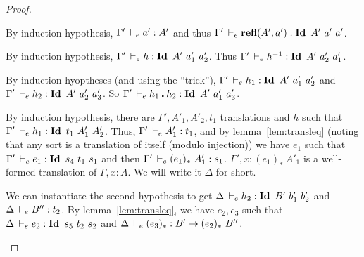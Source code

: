 \documentclass[a4paper,english]{lipics-utf8x}
\begin{document}
\begin{proof}
\begin{caselist}
      \begin{graycase}
        \begin{mathc}
        \end{mathc}
        By induction hypothesis, $\Gamma' \,\vdash_e a' : A'$ and thus
        $\Gamma' \,\vdash_e \operatorname{\mathbf{refl}}(A',a') : \operatorname{\mathbf{Id}~} A'\ a'\ a'$.
      \end{graycase}

      \begin{graycase}
        \begin{mathc}
        \end{mathc}
        By induction hypothesis, $\Gamma' \,\vdash_e h : \operatorname{\mathbf{Id}~} A'\ a'_1\ a'_2$.
        Thus $\Gamma' \,\vdash_e h^{-1} : \operatorname{\mathbf{Id}~} A'\ a'_2\ a'_1$.
      \end{graycase}

      \begin{graycase}
        \begin{mathc}
        \end{mathc}
        By induction hyoptheses (and using the ``trick''),
        $\Gamma' \,\vdash_e h_1 : \operatorname{\mathbf{Id}~} A'\ a'_1\ a'_2$ and
        $\Gamma' \dere h_2 : \Id A'\ a'_2\ a'_3$.
        So $\Gamma' \,\vdash_e h_1 \centerdot h_2 : \operatorname{\mathbf{Id}~} A'\ a'_1\ a'_3$.
      \end{graycase}

      \nextcase
      \begin{mathc}
      \end{mathc}
      By induction hypothesis, there are $\Gamma',A'_1,A'_2,t_1$ translations
      and $h$ such that $\Gamma' \dere h_1 : \Id t_1\ A'_1\ A'_2$.
      Thus, $\Gamma' \,\vdash_e A'_1 : t_1$, and by lemma~\ref{lem:transleq}
      (noting that any sort is a translation of itself (modulo injection))
      we have $e_1$ such that $\Gamma' \dere e_1 : \Id s_4\ t_1\ s_1$ and
      then $\Gamma' \dere (e_1)_*\ A'_1 : s_1$.
      $\Gamma', x : (e_1)_*\ A'_1$ is a well-formed translation of
      $\Gamma, x:A$. We will write it $\Delta$ for short.

      We can instantiate the second hypothesis to get
      $\Delta \,\vdash_e h_2 : \operatorname{\mathbf{Id}~} B'\ b'_1\ b'_2$ and $\Delta \,\vdash_e B'' : t_2$.
      By lemma~\ref{lem:transleq}, we have $e_2,e_3$ such that
      $\Delta \dere e_2 : \Id s_5\ t_2\ s_2$ and
      $\Delta \,\vdash_e (e_3)_* : B' \to (e_2)_*\ B''$.


\end{caselist}
\end{proof}
\end{document}
